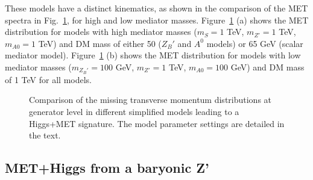 These models have a distinct kinematics, as shown in the comparison of the 
MET spectra in Fig.~\ref{fig:METSimpMonoHiggs}, for high and low mediator masses. 
Figure~\ref{fig:METSimpMonoHiggs} (a) shows the MET distribution 
for models with high mediator masses ($m_{S} = 1$ TeV, $m_{Z'} = 1$ TeV, $m_{A0} = 1$ TeV)
and DM mass of either 50 ($Z_B'$ and $A^0$ models) or 65 GeV (scalar mediator model).
Figure~\ref{fig:METSimpMonoHiggs} (b)  shows the MET distribution 
for models with low mediator masses ($m_{Z_B'} = 100$ GeV, $m_{Z'} = 1$ TeV, $m_{A0} = 100$ GeV)
and DM mass of 1 TeV for all models. 
	

\begin{figure}[hbpt!]
	\centering
	\caption{Comparison of the missing transverse momentum distributions at generator level in different 
		simplified models leading to a Higgs+MET signature. The model parameter settings are detailed in the text.
		\label{fig:METSimpMonoHiggs}}
\end{figure}


\subsection{MET+Higgs from a baryonic Z'}

